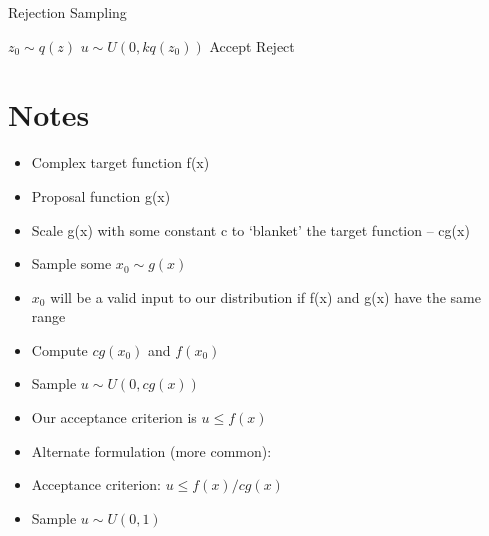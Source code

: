 \documentclass[10pt,a4paper]{article}
\begin{document}
\vspace{0.5cm}

\begin{algorithm}
\caption{Rejection Sampling}
\begin{algorithmic}
\State $z_0 \sim q(z)$
\State $u \sim U(0, kq(z_0))$
	\State Accept
\Else
	\State Reject
\EndIf
\end{algorithmic}
\end{algorithm}

\pagebreak

\section{Notes}
\begin{itemize}
\item Complex target function f(x)
\item Proposal function g(x)
\item Scale g(x) with some constant c to ‘blanket’ the target function -- cg(x)
\item Sample some $x_0 \sim g(x)$
\item $x_0$ will be a valid input to our distribution if f(x) and g(x) have the same range
\item Compute $cg(x_0)$ and $f(x_0)$
\item Sample $u \sim U(0, cg(x))$
\item Our acceptance criterion is $u \leq f(x)$
\item Alternate formulation (more common):
\item Acceptance criterion: $u \leq f(x)/cg(x)$
\item Sample $u \sim U(0, 1)$
\end{itemize}
\end{document}
